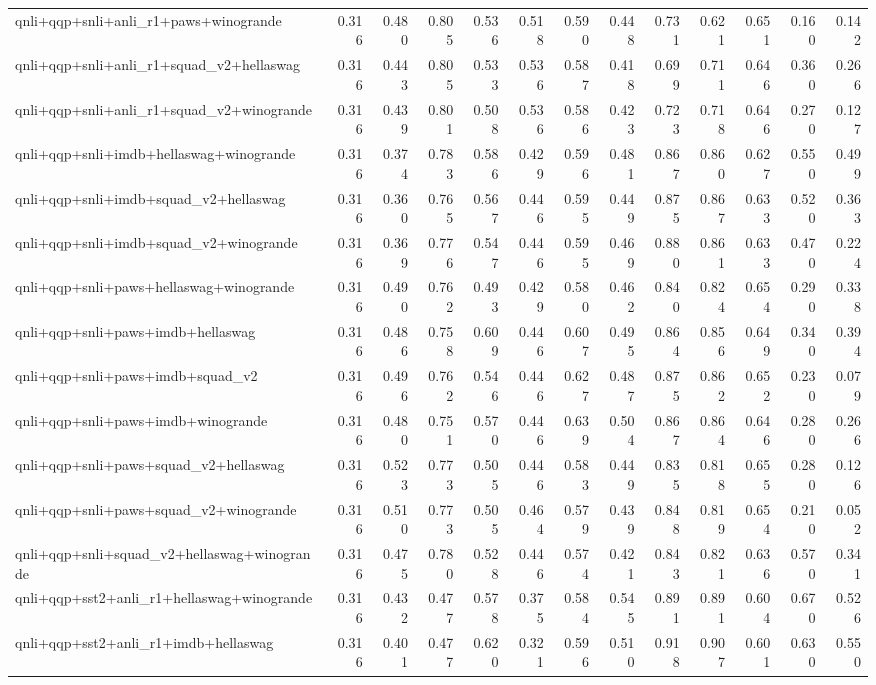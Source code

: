 \begin{table}[t]
\begin{tabular}{lrrrrrrrrrrrr}
    qnli+qqp+snli+anli\_r1+paws+winogrande & 0.316 & 0.480 & 0.805 & 0.536 & 0.518 & 0.590 & 0.448 & 0.731 & 0.621 & 0.651 & 0.160 & 0.142 \\
    qnli+qqp+snli+anli\_r1+squad\_v2+hellaswag & 0.316 & 0.443 & 0.805 & 0.533 & 0.536 & 0.587 & 0.418 & 0.699 & 0.711 & 0.646 & 0.360 & 0.266 \\
    qnli+qqp+snli+anli\_r1+squad\_v2+winogrande & 0.316 & 0.439 & 0.801 & 0.508 & 0.536 & 0.586 & 0.423 & 0.723 & 0.718 & 0.646 & 0.270 & 0.127 \\
    qnli+qqp+snli+imdb+hellaswag+winogrande & 0.316 & 0.374 & 0.783 & 0.586 & 0.429 & 0.596 & 0.481 & 0.867 & 0.860 & 0.627 & 0.550 & 0.499 \\
    qnli+qqp+snli+imdb+squad\_v2+hellaswag & 0.316 & 0.360 & 0.765 & 0.567 & 0.446 & 0.595 & 0.449 & 0.875 & 0.867 & 0.633 & 0.520 & 0.363 \\
    qnli+qqp+snli+imdb+squad\_v2+winogrande & 0.316 & 0.369 & 0.776 & 0.547 & 0.446 & 0.595 & 0.469 & 0.880 & 0.861 & 0.633 & 0.470 & 0.224 \\
    qnli+qqp+snli+paws+hellaswag+winogrande & 0.316 & 0.490 & 0.762 & 0.493 & 0.429 & 0.580 & 0.462 & 0.840 & 0.824 & 0.654 & 0.290 & 0.338 \\
    qnli+qqp+snli+paws+imdb+hellaswag & 0.316 & 0.486 & 0.758 & 0.609 & 0.446 & 0.607 & 0.495 & 0.864 & 0.856 & 0.649 & 0.340 & 0.394 \\
    qnli+qqp+snli+paws+imdb+squad\_v2 & 0.316 & 0.496 & 0.762 & 0.546 & 0.446 & 0.627 & 0.487 & 0.875 & 0.862 & 0.652 & 0.230 & 0.079 \\
    qnli+qqp+snli+paws+imdb+winogrande & 0.316 & 0.480 & 0.751 & 0.570 & 0.446 & 0.639 & 0.504 & 0.867 & 0.864 & 0.646 & 0.280 & 0.266 \\
    qnli+qqp+snli+paws+squad\_v2+hellaswag & 0.316 & 0.523 & 0.773 & 0.505 & 0.446 & 0.583 & 0.449 & 0.835 & 0.818 & 0.655 & 0.280 & 0.126 \\
    qnli+qqp+snli+paws+squad\_v2+winogrande & 0.316 & 0.510 & 0.773 & 0.505 & 0.464 & 0.579 & 0.439 & 0.848 & 0.819 & 0.654 & 0.210 & 0.052 \\
    qnli+qqp+snli+squad\_v2+hellaswag+winogrande & 0.316 & 0.475 & 0.780 & 0.528 & 0.446 & 0.574 & 0.421 & 0.843 & 0.821 & 0.636 & 0.570 & 0.341 \\
    qnli+qqp+sst2+anli\_r1+hellaswag+winogrande & 0.316 & 0.432 & 0.477 & 0.578 & 0.375 & 0.584 & 0.545 & 0.891 & 0.891 & 0.604 & 0.670 & 0.526 \\
    qnli+qqp+sst2+anli\_r1+imdb+hellaswag & 0.316 & 0.401 & 0.477 & 0.620 & 0.321 & 0.596 & 0.510 & 0.918 & 0.907 & 0.601 & 0.630 & 0.550 \\

\end{tabular}
\end{table}
